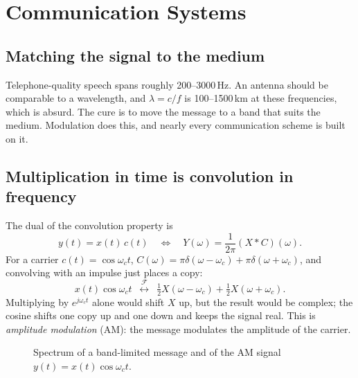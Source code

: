 \documentclass[11pt]{article}
\numberwithin{equation}{section}
\theoremstyle{definition}
\theoremstyle{remark}
\newcommand{\ft}{\;\overset{\mathcal F}{\longleftrightarrow}\;}
\begin{document}
\section{Communication Systems}

\subsection{Matching the signal to the medium}
Telephone-quality speech spans roughly 200--3000\,Hz. An antenna should be comparable to a
wavelength, and $\lambda=c/f$ is 100--1500\,km at these frequencies, which is absurd. The cure is
to move the message to a band that suits the medium. Modulation does this, and nearly every
communication scheme is built on it.

\subsection{Multiplication in time is convolution in frequency}
The dual of the convolution property is
\begin{equation}
y(t)=x(t)\,c(t)\quad\Longleftrightarrow\quad Y(\omega)=\frac{1}{2\pi}(X*C)(\omega).
\end{equation}
For a carrier $c(t)=\cos\omega_ct$, $C(\omega)=\pi\delta(\omega-\omega_c)+\pi\delta(\omega+\omega_c)$,
and convolving with an impulse just places a copy:
\begin{equation}
x(t)\cos\omega_ct\ \ft\ \tfrac12X(\omega-\omega_c)+\tfrac12X(\omega+\omega_c).
\end{equation}
Multiplying by $e^{j\omega_ct}$ alone would shift $X$ up, but the result would be complex; the
cosine shifts one copy up and one down and keeps the signal real. This is
\emph{amplitude modulation} (AM): the message modulates the amplitude of the carrier.

\begin{figure}[h]
\centering
{}
\caption{Spectrum of a band-limited message and of the AM signal $y(t)=x(t)\cos\omega_ct$.}
\end{figure}
\end{document}
